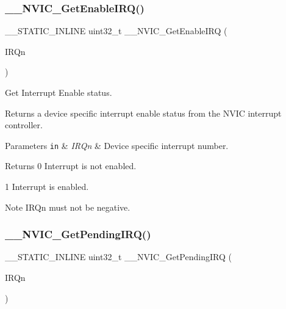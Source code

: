 \subsubsection{\texorpdfstring{\+\_\+\+\_\+\+N\+V\+I\+C\+\_\+\+Get\+Enable\+I\+R\+Q()}{\_\_NVIC\_GetEnableIRQ()}}
{\footnotesize\ttfamily \+\_\+\+\_\+\+S\+T\+A\+T\+I\+C\+\_\+\+I\+N\+L\+I\+NE uint32\+\_\+t \+\_\+\+\_\+\+N\+V\+I\+C\+\_\+\+Get\+Enable\+I\+RQ (\begin{DoxyParamCaption}\item[{\hyperlink{group___peripheral__interrupt__number__definition_ga7e1129cd8a196f4284d41db3e82ad5c8}{I\+R\+Qn\+\_\+\+Type}}]{I\+R\+Qn }\end{DoxyParamCaption})}



Get Interrupt Enable status. 

Returns a device specific interrupt enable status from the N\+V\+IC interrupt controller. 
\begin{DoxyParams}[1]{Parameters}
\mbox{\tt in}  & {\em I\+R\+Qn} & Device specific interrupt number. \\
\hline
\end{DoxyParams}
\begin{DoxyReturn}{Returns}
0 Interrupt is not enabled. 

1 Interrupt is enabled. 
\end{DoxyReturn}
\begin{DoxyNote}{Note}
I\+R\+Qn must not be negative. 
\end{DoxyNote}
\mbox{\label{group___c_m_s_i_s___core___n_v_i_c_functions_ga5a92ca5fa801ad7adb92be7257ab9694}} 
\subsubsection{\texorpdfstring{\+\_\+\+\_\+\+N\+V\+I\+C\+\_\+\+Get\+Pending\+I\+R\+Q()}{\_\_NVIC\_GetPendingIRQ()}}
{\footnotesize\ttfamily \+\_\+\+\_\+\+S\+T\+A\+T\+I\+C\+\_\+\+I\+N\+L\+I\+NE uint32\+\_\+t \+\_\+\+\_\+\+N\+V\+I\+C\+\_\+\+Get\+Pending\+I\+RQ (\begin{DoxyParamCaption}\item[{\hyperlink{group___peripheral__interrupt__number__definition_ga7e1129cd8a196f4284d41db3e82ad5c8}{I\+R\+Qn\+\_\+\+Type}}]{I\+R\+Qn }\end{DoxyParamCaption})}



